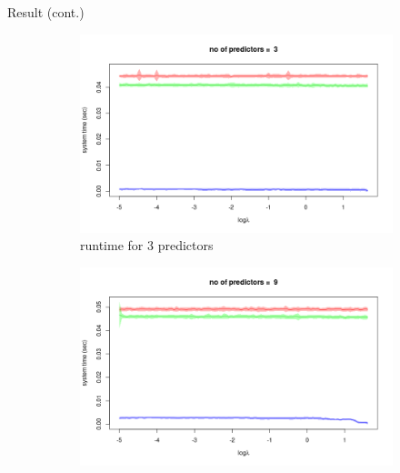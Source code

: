 \documentclass[tikz]{beamer}					%
\begin{document}
{
\begin{frame}{Result (cont.)}
\begin{figure}
\begin{subfigure}{.5\textwidth}
  \centering
  \includegraphics[width=.8\linewidth]{figures/lamb_1.png}
  \caption{runtime for 3 predictors}
\end{subfigure}%
\begin{subfigure}{.5\textwidth}
  \centering
  \includegraphics[width=.8\linewidth]{figures/lamb_2.png}

\end{subfigure}
\end{figure}
\end{frame}}
\end{document}
